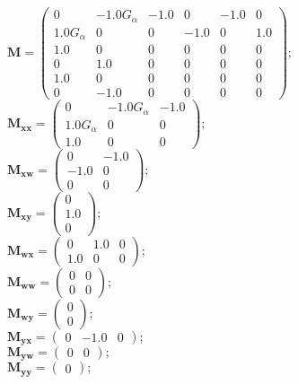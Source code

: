 \documentclass[11pt, oneside]{article}      %
\begin{document}
%
$ \mathbf{M} = \left(\begin{array}{cccccc}0 & - 1.0 G_{\alpha} & -1.0 & 0 & -1.0 & 0\\1.0 G_{\alpha} & 0 & 0 & -1.0 & 0 & 1.0\\1.0 & 0 & 0 & 0 & 0 & 0\\0 & 1.0 & 0 & 0 & 0 & 0\\1.0 & 0 & 0 & 0 & 0 & 0\\0 & -1.0 & 0 & 0 & 0 & 0\end{array}\right) ; $ 
%
\\
%
$ \mathbf{M_{xx}} = \left(\begin{array}{ccc}0 & - 1.0 G_{\alpha} & -1.0\\1.0 G_{\alpha} & 0 & 0\\1.0 & 0 & 0\end{array}\right) ; $ 
%
\\
%
$ \mathbf{M_{xw}} = \left(\begin{array}{cc}0 & -1.0\\-1.0 & 0\\0 & 0\end{array}\right) ; $ 
%
\\
%
$ \mathbf{M_{xy}} = \left(\begin{array}{c}0\\1.0\\0\end{array}\right) ; $ 
%
\\
%
$ \mathbf{M_{wx}} = \left(\begin{array}{ccc}0 & 1.0 & 0\\1.0 & 0 & 0\end{array}\right) ; $ 
%
\\
%
$ \mathbf{M_{ww}} = \left(\begin{array}{cc}0 & 0\\0 & 0\end{array}\right) ; $ 
%
\\
%
$ \mathbf{M_{wy}} = \left(\begin{array}{c}0\\0\end{array}\right) ; $ 
%
\\
%
$ \mathbf{M_{yx}} = \left(\begin{array}{ccc}0 & -1.0 & 0\end{array}\right) ; $ 
%
\\
%
$ \mathbf{M_{yw}} = \left(\begin{array}{cc}0 & 0\end{array}\right) ; $ 
%
\\
%
$ \mathbf{M_{yy}} = \left(\begin{array}{c}0\end{array}\right) ; $ 
%
\\
%
\end{document}
